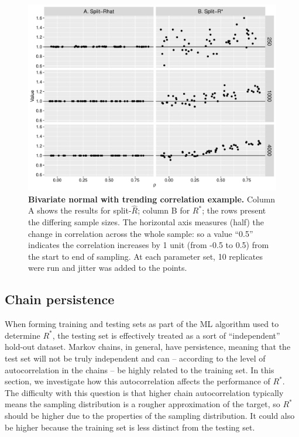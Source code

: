 \documentclass{article}
\begin{document}
\begin{figure}[!htb]
	\centerline{\includegraphics[width=1.0\textwidth]{../output/trends_joint_distribution.pdf}}
	\caption{\textbf{Bivariate normal with trending correlation example.} Column A shows the results for split-$\widehat{R}$; column B for $R^*$; the rows present the differing sample sizes. The horizontal axis measures (half) the change in correlation across the whole sample: so a value ``0.5'' indicates the correlation increases by 1 unit (from -0.5 to 0.5) from the start to end of sampling. At each parameter set, 10 replicates were run and jitter was added to the points.}
	\label{fig:trends_joint_distribution}
\end{figure}

\subsection{Chain persistence}\label{sec:non-stationary_persistence}
When forming training and testing sets as part of the ML algorithm used to determine $R^*$, the testing set is effectively treated as a sort of ``independent'' hold-out dataset. Markov chains, in general, have persistence, meaning that the test set will not be truly independent and can -- according to the level of autocorrelation in the chains -- be highly related to the training set. In this section, we investigate how this autocorrelation affects the performance of $R^*$. The difficulty with this question is that higher chain autocorrelation typically means the sampling distribution is a rougher approximation of the target, so $R^*$ should be higher due to the properties of the sampling distribution. It could also be higher because the training set is less distinct from the testing set.
\end{document}
